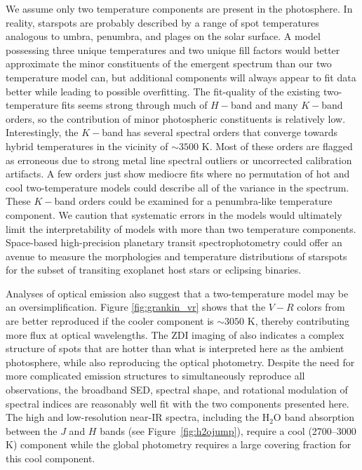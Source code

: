 \documentclass[twocolumn]{emulateapj}%
\begin{document}
We assume only two temperature components are present in the photosphere.  In reality, starspots are probably described by a range of spot temperatures analogous to umbra, penumbra, and plages on the solar surface.  A model possessing three unique temperatures and two unique fill factors would better approximate the minor constituents of the emergent spectrum than our two temperature model can, but additional components will always appear to fit data better while leading to possible overfitting.  The fit-quality of the existing two-temperature fits seems strong through much of $H-$band and many $K-$band orders, so the contribution of minor photospheric constituents is relatively low.  Interestingly, the $K-$band has several spectral orders that converge towards hybrid temperatures in the vicinity of $\sim3500$ K.  Most of these orders are flagged as erroneous due to strong metal line spectral outliers or uncorrected calibration artifacts.  A few orders just show mediocre fits where no permutation of hot and cool two-temperature models could describe all of the variance in the spectrum.  These $K-$band orders could be examined for a penumbra-like temperature component.  We caution that systematic errors in the models would ultimately limit the interpretability of models with more than two temperature components.  Space-based high-precision planetary transit spectrophotometry could offer an avenue to measure the morphologies and temperature distributions of starspots for the subset of transiting exoplanet host stars or eclipsing binaries.

Analyses of optical emission also suggest that a two-temperature model may be an oversimplification.  Figure \ref{fig:grankin_vr} shows that the $V-R$ colors from \citet{grankin08} are better reproduced if the cooler component is $\sim 3050$ K, thereby contributing more flux at optical wavelengths.  The ZDI imaging of \citet{donati14} also indicates a complex structure of spots that are hotter than what is interpreted here as the ambient photosphere, while also reproducing the optical photometry.  Despite the need for more complicated emission structures to simultaneously reproduce all observations, the broadband SED, spectral shape, and rotational modulation of spectral indices are reasonably well fit with the two components presented here.  The high and low-resolution near-IR spectra, including the H$_2$O band absorption between the $J$ and $H$ bands (see Figure~\ref{fig:h2ojump}), require a cool (2700--3000 K) component while the global photometry requires a large covering fraction for this cool component.  
\end{document}
